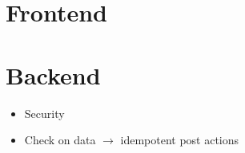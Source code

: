 
\section{Frontend}


\section{Backend}

\begin{itemize}
\item Security
\item Check on data $\rightarrow$ idempotent post actions  
\end{itemize}